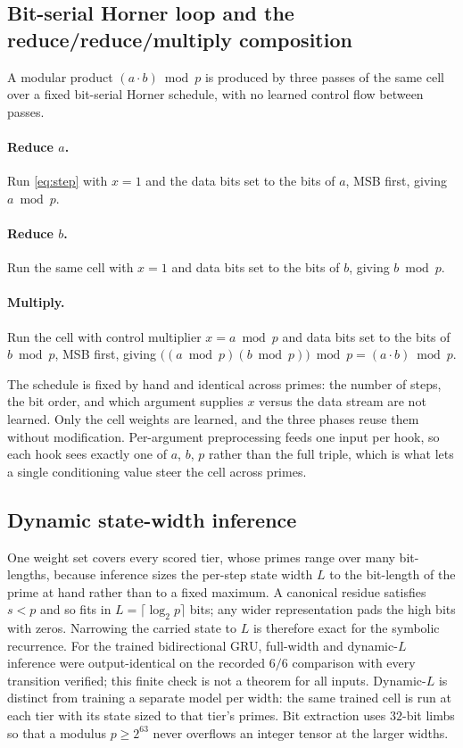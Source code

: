 \documentclass[11pt]{article}
\begin{document}
\subsection{Bit-serial Horner loop and the reduce/reduce/multiply composition}
\label{sec:method:horner}

A modular product $(a \cdot b) \bmod p$ is produced by three passes of the same
cell over a fixed bit-serial Horner schedule, with no learned control flow between
passes.

\paragraph{Reduce $a$.} Run \eqref{eq:step} with $x=1$ and the data bits set to the
bits of $a$, MSB first, giving $a \bmod p$.

\paragraph{Reduce $b$.} Run the same cell with $x=1$ and data bits set to the bits
of $b$, giving $b \bmod p$.

\paragraph{Multiply.} Run the cell with control multiplier $x = a \bmod p$ and data
bits set to the bits of $b \bmod p$, MSB first, giving
$\big((a \bmod p)(b \bmod p)\big) \bmod p = (a \cdot b) \bmod p$.

The schedule is fixed by hand and identical across primes: the number of steps, the
bit order, and which argument supplies $x$ versus the data stream are not learned.
Only the cell weights are learned, and the three phases reuse them without
modification. Per-argument preprocessing feeds one input per hook, so each hook
sees exactly one of $a$, $b$, $p$ rather than the full triple, which is what lets a
single conditioning value steer the cell across primes.

\subsection{Dynamic state-width inference}
\label{sec:method:dynl}

One weight set covers every scored tier, whose primes range over many bit-lengths,
because inference sizes the per-step state width $L$ to the bit-length of the prime
at hand rather than to a fixed maximum. A canonical residue satisfies $s < p$ and
so fits in $L = \lceil \log_2 p \rceil$ bits; any wider representation pads the
high bits with zeros. Narrowing the carried state to $L$ is therefore exact for the
symbolic recurrence. For the trained bidirectional GRU, full-width and dynamic-$L$
inference were output-identical on the recorded $6/6$ comparison with every
transition verified; this finite check is not a theorem for all inputs. Dynamic-$L$
is distinct from
training a separate model per width: the same trained cell is run at each tier with
its state sized to that tier's primes. Bit extraction uses $32$-bit limbs so that a
modulus $p \ge 2^{63}$ never overflows an integer tensor at the larger widths.
\end{document}
